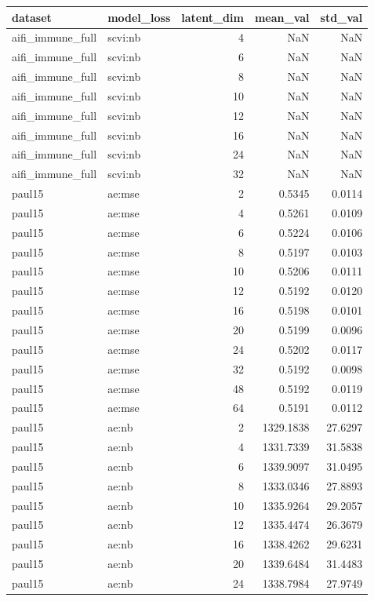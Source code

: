 \begin{tabular}{llrrr}
\toprule
dataset & model\_loss & latent\_dim & mean\_val & std\_val \\
\midrule
aifi\_immune\_full & scvi:nb & 4 & NaN & NaN \\
aifi\_immune\_full & scvi:nb & 6 & NaN & NaN \\
aifi\_immune\_full & scvi:nb & 8 & NaN & NaN \\
aifi\_immune\_full & scvi:nb & 10 & NaN & NaN \\
aifi\_immune\_full & scvi:nb & 12 & NaN & NaN \\
aifi\_immune\_full & scvi:nb & 16 & NaN & NaN \\
aifi\_immune\_full & scvi:nb & 24 & NaN & NaN \\
aifi\_immune\_full & scvi:nb & 32 & NaN & NaN \\
paul15 & ae:mse & 2 & 0.5345 & 0.0114 \\
paul15 & ae:mse & 4 & 0.5261 & 0.0109 \\
paul15 & ae:mse & 6 & 0.5224 & 0.0106 \\
paul15 & ae:mse & 8 & 0.5197 & 0.0103 \\
paul15 & ae:mse & 10 & 0.5206 & 0.0111 \\
paul15 & ae:mse & 12 & 0.5192 & 0.0120 \\
paul15 & ae:mse & 16 & 0.5198 & 0.0101 \\
paul15 & ae:mse & 20 & 0.5199 & 0.0096 \\
paul15 & ae:mse & 24 & 0.5202 & 0.0117 \\
paul15 & ae:mse & 32 & 0.5192 & 0.0098 \\
paul15 & ae:mse & 48 & 0.5192 & 0.0119 \\
paul15 & ae:mse & 64 & 0.5191 & 0.0112 \\
paul15 & ae:nb & 2 & 1329.1838 & 27.6297 \\
paul15 & ae:nb & 4 & 1331.7339 & 31.5838 \\
paul15 & ae:nb & 6 & 1339.9097 & 31.0495 \\
paul15 & ae:nb & 8 & 1333.0346 & 27.8893 \\
paul15 & ae:nb & 10 & 1335.9264 & 29.2057 \\
paul15 & ae:nb & 12 & 1335.4474 & 26.3679 \\
paul15 & ae:nb & 16 & 1338.4262 & 29.6231 \\
paul15 & ae:nb & 20 & 1339.6484 & 31.4483 \\
paul15 & ae:nb & 24 & 1338.7984 & 27.9749 \\

\end{tabular}
